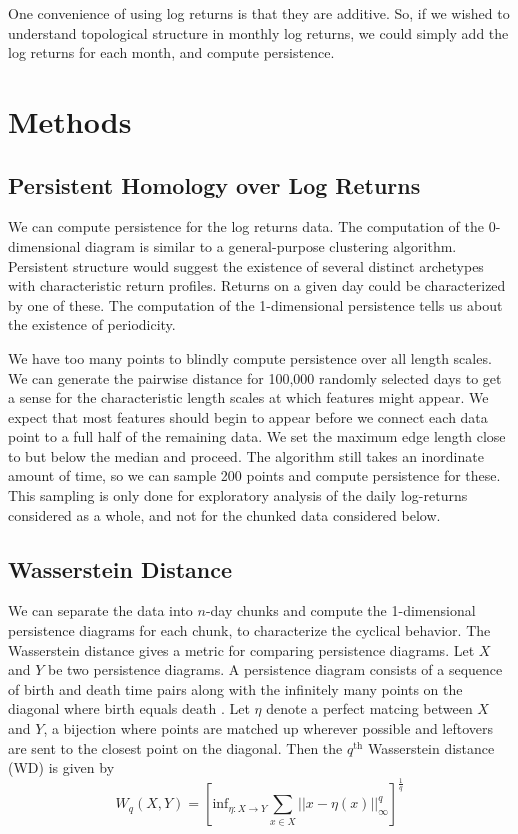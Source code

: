 \documentclass{article}
\begin{document}
One convenience of using log returns is that they are additive. So, if we wished to understand topological structure in monthly log returns, we could simply add the log returns for each month, and compute persistence. 

\section{Methods}

\subsection{Persistent Homology over Log Returns}
We can compute persistence for the log returns data. The computation of the  0-dimensional diagram is similar to a general-purpose clustering algorithm. Persistent structure would suggest the existence of several distinct archetypes with characteristic return profiles. Returns on a given day could be characterized by one of these. The computation of the 1-dimensional persistence tells us about the existence of periodicity. 

We have too many points to blindly compute persistence over all length scales. We can generate the pairwise distance for 100,000 randomly selected days to get a sense for the characteristic length scales at which features might appear. We expect that most features should begin to appear before we connect each data point to a full half of the remaining data. We set the maximum edge length close to but below the median and proceed. The algorithm still takes an inordinate amount of time, so we can sample 200 points and compute persistence for these. This sampling is only done for exploratory analysis of the daily log-returns considered as a whole, and not for the chunked data considered below.

\subsection{Wasserstein Distance}

We can separate the data into $n$-day chunks and compute the 1-dimensional persistence diagrams for each chunk, to characterize the cyclical behavior. The Wasserstein distance gives a metric for comparing persistence diagrams. Let $X$ and $Y$ be two persistence diagrams. A persistence diagram consists of a sequence of birth and death time pairs along with the infinitely many points on the diagonal where birth equals death . Let $\eta$ denote a perfect matcing between $X$ and $Y$, a bijection where points are matched up wherever possible and leftovers are sent to the closest point on the diagonal. Then the $q^{\text{th}}$ Wasserstein distance (WD)  is given by 
\[
W_q(X,Y) = \left[ \text{inf}_{\eta:X \rightarrow Y} \sum_{x \in X} || x  - \eta(x) ||^q_\infty \right]^{\frac{1}{q}}
\]
\end{document}
